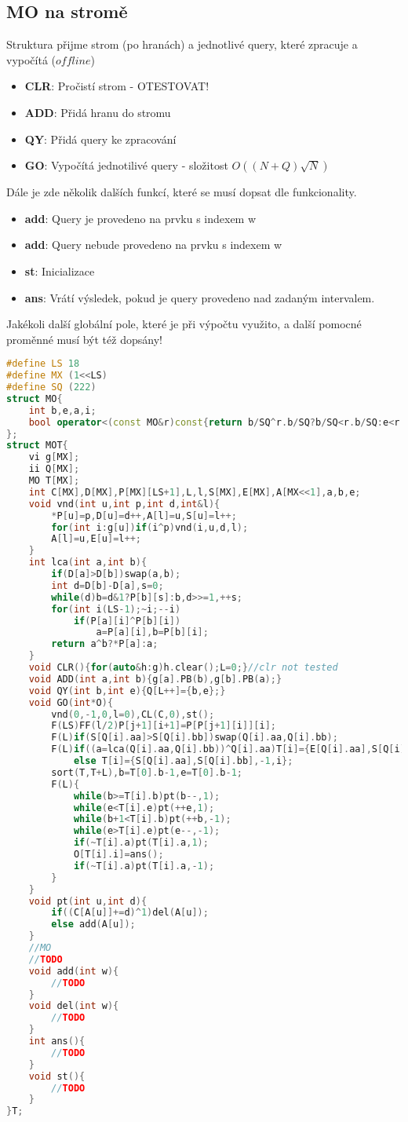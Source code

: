 \documentclass[11pt]{article}
\begin{document}
\subsection{MO na stromě}
Struktura přijme strom (po hranách) a jednotlivé query, které zpracuje a vypočítá ($offline$)
\begin{itemize}
\item \textbf{CLR}: Pročistí strom - OTESTOVAT!
\item \textbf{ADD}: Přidá hranu do stromu
\item \textbf{QY}: Přidá query ke zpracování
\item \textbf{GO}: Vypočítá jednotilivé query - složitost $O((N+Q)\sqrt{N})$
\end{itemize}
Dále je zde několik dalších funkcí, které se musí dopsat dle funkcionality.
\begin{itemize}
\item \textbf{add}: Query je provedeno na prvku s indexem \textsf{w} 
\item \textbf{add}: Query nebude provedeno na prvku s indexem \textsf{w}
\item \textbf{st}: Inicializace
\item \textbf{ans}: Vrátí výsledek, pokud je query provedeno nad zadaným intervalem.
\end{itemize}
Jakékoli další globální pole, které je při výpočtu využito, a další pomocné proměnné musí být též dopsány!
\begin{lstlisting}[language=C++]
#define LS 18
#define MX (1<<LS)
#define SQ (222)
struct MO{
    int b,e,a,i;
    bool operator<(const MO&r)const{return b/SQ^r.b/SQ?b/SQ<r.b/SQ:e<r.e;}
};
struct MOT{
    vi g[MX];
    ii Q[MX];
    MO T[MX];
    int C[MX],D[MX],P[MX][LS+1],L,l,S[MX],E[MX],A[MX<<1],a,b,e;
    void vnd(int u,int p,int d,int&l){
        *P[u]=p,D[u]=d++,A[l]=u,S[u]=l++;
        for(int i:g[u])if(i^p)vnd(i,u,d,l);
        A[l]=u,E[u]=l++;
    }
    int lca(int a,int b){
        if(D[a]>D[b])swap(a,b);
        int d=D[b]-D[a],s=0;
        while(d)b=d&1?P[b][s]:b,d>>=1,++s;
        for(int i(LS-1);~i;--i)
            if(P[a][i]^P[b][i])
                a=P[a][i],b=P[b][i];
        return a^b?*P[a]:a;
    }
    void CLR(){for(auto&h:g)h.clear();L=0;}//clr not tested
    void ADD(int a,int b){g[a].PB(b),g[b].PB(a);}
    void QY(int b,int e){Q[L++]={b,e};}
    void GO(int*O){
        vnd(0,-1,0,l=0),CL(C,0),st();
        F(LS)FF(l/2)P[j+1][i+1]=P[P[j+1][i]][i];
        F(L)if(S[Q[i].aa]>S[Q[i].bb])swap(Q[i].aa,Q[i].bb);
        F(L)if((a=lca(Q[i].aa,Q[i].bb))^Q[i].aa)T[i]={E[Q[i].aa],S[Q[i].bb],S[a],i};
            else T[i]={S[Q[i].aa],S[Q[i].bb],-1,i};
        sort(T,T+L),b=T[0].b-1,e=T[0].b-1;
        F(L){
            while(b>=T[i].b)pt(b--,1);
            while(e<T[i].e)pt(++e,1);
            while(b+1<T[i].b)pt(++b,-1);
            while(e>T[i].e)pt(e--,-1);
            if(~T[i].a)pt(T[i].a,1);
            O[T[i].i]=ans();
            if(~T[i].a)pt(T[i].a,-1);
        }
    }
    void pt(int u,int d){
        if((C[A[u]]+=d)^1)del(A[u]);
        else add(A[u]);
    }
    //MO
	//TODO
    void add(int w){
        //TODO
    }
    void del(int w){
        //TODO
    }
    int ans(){
        //TODO
    }
    void st(){
        //TODO
    }
}T;
\end{lstlisting}
\end{document}
